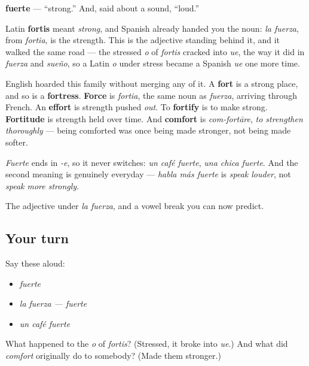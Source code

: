\begin{cousinweb}
\textbf{fuerte} — \textquotedblleft{}strong.\textquotedblright{} And, said about a sound, \textquotedblleft{}loud.\textquotedblright{}

Latin \textbf{fortis} meant \emph{strong}, and Spanish already handed you the noun: \emph{la fuerza}, from \emph{fortia}, is the strength. This is the adjective standing behind it, and it walked the same road — the stressed \emph{o} of \emph{fortis} cracked into \emph{ue}, the way it did in \emph{fuerza} and \emph{sueño}, so a Latin \emph{o} under stress became a Spanish \emph{ue} one more time.

English hoarded this family without merging any of it. A \textbf{fort} is a strong place, and so is a \textbf{fortress}. \textbf{Force} is \emph{fortia}, the same noun as \emph{fuerza}, arriving through French. An \textbf{effort} is strength pushed \emph{out}. To \textbf{fortify} is to make strong. \textbf{Fortitude} is strength held over time. And \textbf{comfort} is \emph{com-fortāre}, \emph{to strengthen thoroughly} — being comforted was once being made stronger, not being made softer.

\emph{Fuerte} ends in \emph{-e}, so it never switches: \emph{un café fuerte}, \emph{una chica fuerte}. And the second meaning is genuinely everyday — \emph{habla más fuerte} is \emph{speak louder}, not \emph{speak more strongly}.
\end{cousinweb}

\begin{grammarlens}[title={What you've built}]
The adjective under \emph{la fuerza}, and a vowel break you can now predict.
\end{grammarlens}

\subsection*{Your turn}
Say these aloud:

\begin{itemize}
\raggedright
  \item \emph{fuerte}
  \item \emph{la fuerza — fuerte}
  \item \emph{un café fuerte}
\end{itemize}

\begin{tcolorbox}[breakable,colback=teal!4,colframe=teal!35!black,title={Before you move on}]
What happened to the \emph{o} of \emph{fortis}? (Stressed, it broke into \emph{ue}.) And what did \emph{comfort} originally do to somebody? (Made them stronger.)
\end{tcolorbox}
